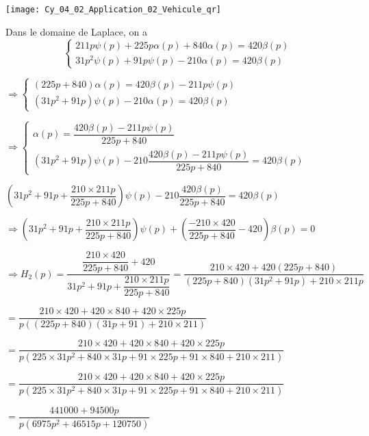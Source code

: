 \ifprof
\else
\begin{marginfigure}
\centering
\texttt{[image: Cy\_04\_02\_Application\_02\_Vehicule\_qr]}
\end{marginfigure}
\fi


\ifprof
\begin{corrige}
Dans le domaine de Laplace, on a 
$$
\left\{
\begin{array}{l}
211 p {\psi}(p)+225p{\alpha}(p)+840\alpha(p)=420\beta(p) \\
31p^2{\psi}(p)+91p{\psi}(p)-210\alpha(p)=420\beta(p) 
\end{array}
\right. $$

$
\Rightarrow \left\{
\begin{array}{l}
\left(225p+840\right)\alpha(p)=420\beta(p) - 211 p {\psi}(p)\\
\left(31p^2+91p\right){\psi}(p)-210\alpha(p)=420\beta(p) 
\end{array}
\right. $

$
\Rightarrow \left\{
\begin{array}{l}
\alpha(p)=\dfrac{420\beta(p) - 211 p {\psi}(p)}{225p+840}\\
\left(31p^2+91p\right){\psi}(p)-210\dfrac{420\beta(p) - 211 p {\psi}(p)}{225p+840}=420\beta(p) 
\end{array}
\right. $

$\left(31p^2+91p + \dfrac{210\times 211p}{225p+840}\right){\psi}(p)-210\dfrac{420\beta(p)}{225p+840}=420\beta(p) $

$\Rightarrow \left(31p^2+91p + \dfrac{210\times 211p}{225p+840}\right){\psi}(p)+\left(\dfrac{-210\times 420}{225p+840}-420\right)\beta(p)=0 $

$\Rightarrow H_2(p) = \dfrac{\dfrac{210\times 420}{225p+840}+420}{31p^2+91p + \dfrac{210\times 211p}{225p+840}} 
 = \dfrac{210\times 420+420\left(225p+840\right)}{\left(225p+840\right)\left(31p^2+91p \right)+ 210\times 211p}   $

$ = \dfrac{210\times 420+420\times 840+420\times 225p}{p\left(\left(225p+840\right)\left(31p+91 \right)+ 210\times 211\right)}   $


$ = \dfrac{210\times 420+420\times 840+420\times 225p}{p\left(225\times 31 p^2 
+840\times 31 p + 91 \times 225 p+91\times 840 + 210\times 211\right)}   $

$ = \dfrac{210\times 420+420\times 840+420\times 225p}{p\left(225\times 31 p^2 
+840\times 31 p + 91 \times 225 p+91\times 840 + 210\times 211\right)}   $

$ = \dfrac{441000+94500p}{p\left(6975  p^2 
+46515 p+120750\right)}   $
\end{corrige}
\else
\fi



